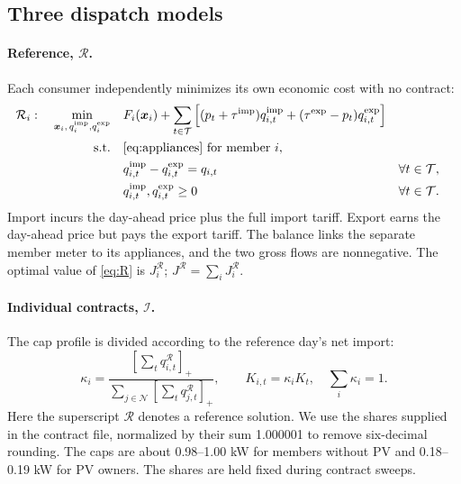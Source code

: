 \documentclass[10pt,a4paper]{article}
\newcommand{\pos}[1]{\left[#1\right]_+}
\newcommand{\Rmod}{\mathcal R}
\newcommand{\Imod}{\mathcal I}
\begin{document}
\subsection{Three dispatch models}
\paragraph{Reference, \(\Rmod\).} Each consumer independently minimizes its own economic cost with no contract:
\begin{subequations}\label{eq:R}
\begin{align}
\Rmod_i:\quad
\min_{\bm x_i,\,q^{\rm imp}_i,q^{\rm exp}_i}\quad
 &F_i(\bm x_i)+\sum_{t\in\mathcal T}
 \left[(p_t+\tau^{\rm imp})q_{i,t}^{\rm imp}
       +(\tau^{\rm exp}-p_t)q_{i,t}^{\rm exp}\right]\\
\text{s.t.}\quad
 &\eqref{eq:appliances}\ \text{for member }i,\nonumber\\
 &q_{i,t}^{\rm imp}-q_{i,t}^{\rm exp}=q_{i,t}
       &&\forall t\in\mathcal T,\\
 &q_{i,t}^{\rm imp},q_{i,t}^{\rm exp}\geq0
       &&\forall t\in\mathcal T.
\end{align}
\end{subequations}
Import incurs the day-ahead price plus the full import tariff. Export earns the day-ahead price but pays the export tariff. The balance links the separate member meter to its appliances, and the two gross flows are nonnegative. The optimal value of \eqref{eq:R} is $J_i^{\Rmod}$; $J^{\Rmod}=\sum_i J_i^{\Rmod}$.

\paragraph{Individual contracts, \(\Imod\).} The cap profile is divided according to the reference day's net import:
\begin{equation}
\kappa_i =
\frac{\pos{\sum_t q_{i,t}^{\Rmod}}}{\sum_{j\in\mathcal N}\pos{\sum_t q_{j,t}^{\Rmod}}},
\qquad K_{i,t}=\kappa_i K_t,\quad \sum_i\kappa_i=1.
\label{eq:share}
\end{equation}
Here the superscript $\Rmod$ denotes a reference solution. We use the shares supplied in the contract file, normalized by their sum 1.000001 to remove six-decimal rounding. The caps are about 0.98--1.00 kW for members without PV and 0.18--0.19 kW for PV owners. The shares are held fixed during contract sweeps.
\end{document}
